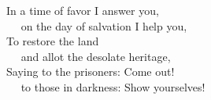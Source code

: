 
\lettrine{I}{}n a time of favor I answer you,\\
   on the day of salvation I help you,\\
To restore the land\\
   and allot the desolate heritage,\\
Saying to the prisoners: Come out!\\
   to those in darkness: Show yourselves!